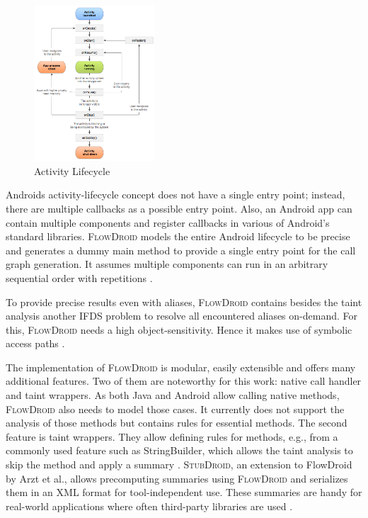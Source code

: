 \documentclass[../draft.tex]{subfiles}
\begin{document}
    \begin{figure}[ht]
        \centering
        \includegraphics[width=0.4\textwidth]{figs/activity_lifecycle.png}
        \caption{Activity Lifecycle\protect\footnotemark}
        \label{f:activity}
    \end{figure}

    Androids activity-lifecycle concept does not have a single entry point; instead, there are multiple callbacks as a possible entry point. Also, an Android app can contain multiple components and register callbacks in various of Android's standard libraries. \textsc{FlowDroid} models the entire Android lifecycle to be precise and generates a dummy main method to provide a single entry point for the call graph generation. It assumes multiple components can run in an arbitrary sequential order with repetitions \cite{Arzt2014}.

    To provide precise results even with aliases, \textsc{FlowDroid} contains besides the taint analysis another IFDS problem to resolve all encountered aliases on-demand. For this, \textsc{FlowDroid} needs a high object-sensitivity. Hence it makes use of symbolic access paths \cite{Arzt2014} .

    The implementation of \textsc{FlowDroid} is modular, easily extensible and offers many additional features. Two of them are noteworthy for this work: native call handler and taint wrappers. As both Java and Android allow calling native methods, \textsc{FlowDroid} also needs to model those cases. It currently does not support the analysis of those methods but contains rules for essential methods. The second feature is taint wrappers. They allow defining rules for methods, e.g., from a commonly used feature such as StringBuilder, which allows the taint analysis to skip the method and apply a summary \cite{Arzt2014}. \textsc{StubDroid}, an extension to FlowDroid by Arzt et al., allows precomputing summaries using \textsc{FlowDroid} and serializes them in an XML format for tool-independent use. These summaries are handy for real-world applications where often third-party libraries are used \cite{Arzt2017PhD}.
\end{document}
